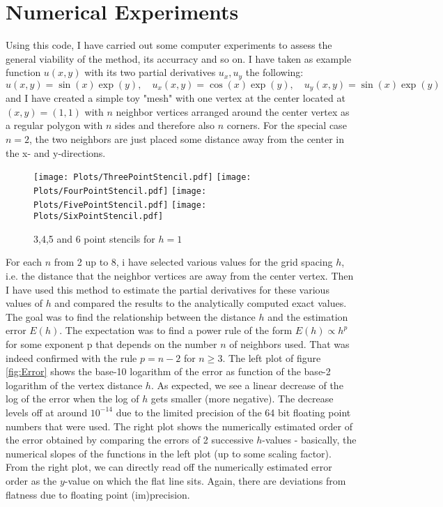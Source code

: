 \section{Numerical Experiments}
Using this code, I have carried out some computer experiments to assess the general viability of the method, its accurracy and so on. I have taken as example function $u(x,y)$ with its two partial derivatives $u_x,u_y$ the following:
\begin{equation}
u(x,y)   = \sin (x) \exp (y), \quad 
u_x(x,y) = \cos (x) \exp (y), \quad
u_y(x,y) = \sin (x) \exp (y)
\end{equation}
and I have created a simple toy "mesh" with one vertex at the center located at $(x,y)=(1,1)$ with $n$ neighbor vertices arranged around the center vertex as a regular polygon with $n$ sides and therefore also $n$ corners. For the special case $n=2$, the two neighbors are just placed some distance away from the center in the x- and y-directions.
\begin{figure}[h]
	\centering
  	\texttt{[image: Plots/ThreePointStencil.pdf]}
  	\texttt{[image: Plots/FourPointStencil.pdf]}
  	\texttt{[image: Plots/FivePointStencil.pdf]}
  	\texttt{[image: Plots/SixPointStencil.pdf]}
	\caption{3,4,5 and 6 point stencils for $h=1$}
	\label{fig:FivePointStencil}
\end{figure}
For each $n$ from 2 up to 8, i have selected various values for the grid spacing $h$, i.e. the distance that the neighbor vertices are away from the center vertex. Then I have used this method to estimate the partial derivatives for these various values of $h$ and compared the results to the analytically computed exact values. The goal was to find the relationship between the distance $h$ and the estimation error $E(h)$. The expectation was to find a power rule of the form $E(h) \propto h^p$ for some exponent p that depends on the number $n$ of neighbors used. That was indeed confirmed with the rule $p = n-2$ for $n \geq 3$. The left plot of figure \ref{fig:Error} shows the base-10 logarithm of the error as function of the base-2 logarithm of the vertex distance $h$. As expected, we see a linear decrease of the log of the error when the log of $h$ gets smaller (more negative). The decrease levels off at around $10^{-14}$ due to the limited precision of the 64 bit floating point numbers that were used. The right plot shows the numerically estimated order of the error obtained by comparing the errors of 2 successive $h$-values - basically, the numerical slopes of the functions in the left plot (up to some scaling factor). From the right plot, we can directly read off the numerically estimated error order as the $y$-value on which the flat line sits. Again, there are deviations from flatness due to floating point (im)precision.
